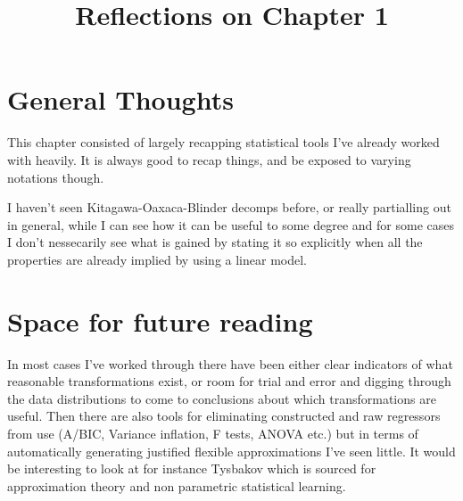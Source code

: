 \documentclass[10pt, english]{article}
\begin{document}
\title{Reflections on Chapter 1}
\date{}

\maketitle


\section*{General Thoughts}
This chapter consisted of largely recapping statistical tools I've already worked with heavily. 
It is always good to recap things, and be exposed to varying notations though.

I haven't seen Kitagawa-Oaxaca-Blinder decomps before, or really partialling out in general, while I can see how it can be useful to
some degree and for some cases I don't nessecarily see what is gained by stating it so explicitly when all the properties are already implied
by using a linear model.
\section*{Space for future reading}
In most cases I've worked through there have been either clear indicators of what reasonable transformations exist, or room 
for trial and error and digging through the data distributions to come to conclusions about which transformations are useful. Then there
are also tools for eliminating constructed and raw regressors from use (A/BIC, Variance inflation, F tests, ANOVA etc.) but in terms of automatically
generating justified flexible approximations I've seen little. It would be interesting to look at for instance Tysbakov which is sourced for approximation theory 
and non parametric statistical learning.
\end{document}
